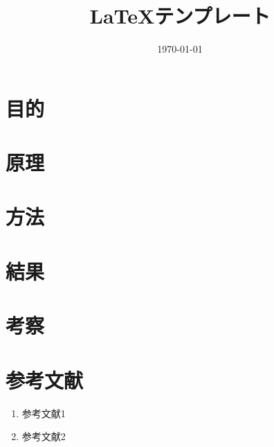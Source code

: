 \documentclass[a4paper,11pt]{ltjsarticle}
\title{\LaTeX テンプレート}
\author{}
\date{\today}
\begin{document}
\maketitle

\section{目的}

\section{原理}

\section{方法}

\section{結果}

\section{考察}

\section*{参考文献}
\begin{enumerate}
	\item 参考文献1
	\item 参考文献2
\end{enumerate}
\end{document}
